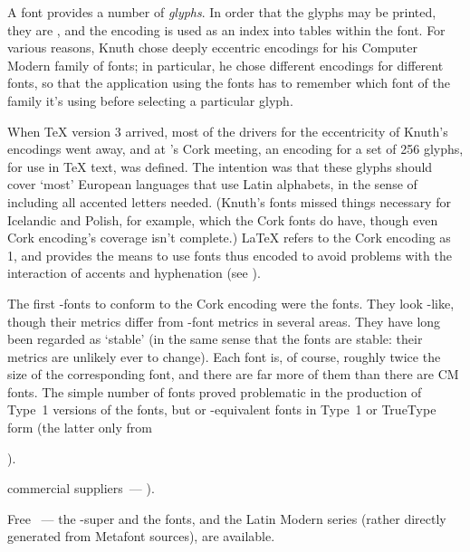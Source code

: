 
A font provides a number of \emph{glyphs}. In order that the glyphs
may be printed, they are , and the
encoding is used as an index into tables within the font.  For various
reasons, Knuth chose deeply eccentric encodings for his Computer
Modern family of fonts; in particular, he chose different encodings
for different fonts, so that the application using the fonts has to
remember which font of the family it's using before selecting a
particular glyph.

When \TeX{} version 3 arrived, most of the drivers for the
eccentricity of Knuth's encodings went away, and at 's Cork
meeting, an encoding for a set of 256 glyphs, for use in \TeX{} text,
was defined.  The intention was that these glyphs should cover `most'
European languages that use Latin alphabets, in the sense of including
all accented letters needed.  (Knuth's  fonts missed things
necessary for Icelandic and Polish, for example, which the Cork fonts
do have, though even Cork encoding's coverage isn't complete.)
\LaTeX{} refers to the Cork encoding as 1, and provides the
means to use fonts thus encoded to avoid problems with the interaction
of accents and hyphenation %
(see ).

The first \MF{}-fonts to conform to the Cork encoding were the 
fonts. They look -like, though their metrics differ from -font
metrics in several areas.  They have long been regarded as `stable' (in
the same sense that the  fonts are stable: their metrics are
unlikely ever to change).  Each  font is, of course, roughly twice the
size of the corresponding  font, and there are far more of them than
there are CM fonts.  The simple number of fonts proved problematic in
the production of Type~1 versions of the fonts, but  or
-equivalent fonts in Type~1 or TrueType form (the latter only from
\begin{wideversion}
  ).
\end{wideversion}
\begin{narrowversion}
  commercial suppliers~--- ).
\end{narrowversion}
Free ~--- the -super and
the  fonts, and the Latin Modern series (rather directly generated
from Metafont sources), are available.

